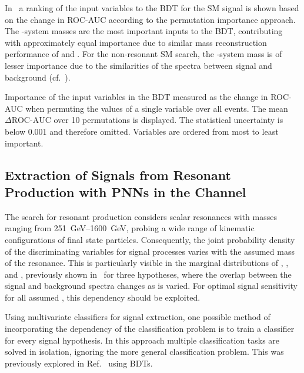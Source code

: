 In~ a ranking of the input variables
to the BDT for the SM \HH signal is shown based on the change in
ROC-AUC according to the permutation importance approach. The
\PHiggs-system masses are the most important inputs to the BDT,
contributing with approximately equal importance due to similar mass
reconstruction performance of \mMMC and \mBB. For the non-resonant SM
\HH search, the \HH-system mass is of lesser importance due to the
similarities of the \mHH spectra between signal and background
(cf.~).

\begin{table}[htbp]
  \centering

  \caption[Importance of the input variables in the BDT discriminant selecting
  the SM~\HH signal.]{Importance of the input variables in the BDT measured as
    the change in ROC-AUC when permuting the values of a single variable over
    all events. The mean $\Delta\text{ROC-AUC}$ over 10 permutations is
    displayed. The statistical uncertainty is below 0.001 and therefore
    omitted. Variables are ordered from most to least important.}%
  \label{tab:variable_importance_bdt}

  {
    \renewcommand{\arraystretch}{1.12}
    
  }
\end{table}


\subsection{Extraction of Signals from Resonant \HH Production with
  PNNs in the \hadhad Channel}%
\label{sec:mva_pnn}

The search for resonant \HH production considers scalar resonances
with masses ranging from \SIrange{251}{1600}{\GeV}, probing a wide
range of kinematic configurations of final state
particles. Consequently, the joint probability density of the
discriminating variables for signal processes varies with the assumed
mass of the resonance. This is particularly visible in the marginal
distributions of \mHH, \dRtautau, and \dRbb, previously shown
in~ for three \mX hypotheses, where the overlap
between the signal and background spectra changes as \mX is
varied. For optimal signal sensitivity for all assumed \mX, this
dependency should be exploited.

Using multivariate classifiers for signal extraction, one possible
method of incorporating the \mX dependency of the classification
problem is to train a classifier for every signal hypothesis. In this
approach multiple classification tasks are solved in isolation,
ignoring the more general classification problem. This was previously
explored in Ref.~\cite{HIGG-2016-16-witherratum} using BDTs.

